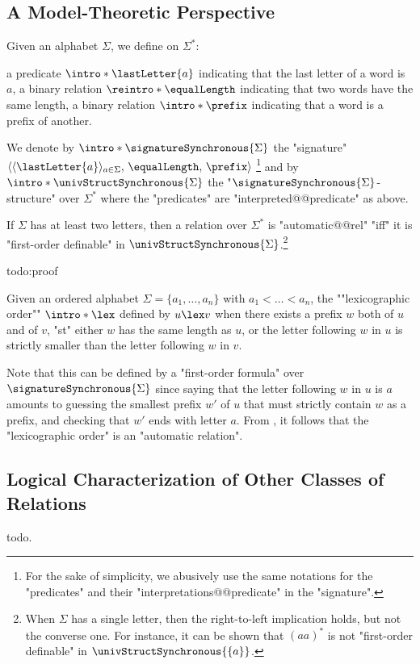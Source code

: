 \subsection{A Model-Theoretic Perspective}

Given an alphabet $\Sigma$, we define on $\Sigma^*$:
\begin{itemize}
	\itemAP a predicate $\intro*\lastLetter{a}$ indicating that the last letter of a word is $a$,
	\itemAP a binary relation $\reintro*\equalLength$ indicating that two words have the same length,
	\itemAP a binary relation $\intro*\prefix$ indicating that a word is a prefix of another.
\end{itemize} 
We denote by $\intro*\signatureSynchronous{\Sigma}$ the "signature" $\langle \langle\lastLetter{a}\rangle_{a \in \Sigma},\, \equalLength,\, \prefix \rangle$%
\footnote{For the sake of simplicity, we abusively use the same notations for
the "predicates" and their "interpretations@@predicate" in the "signature".} and
by \AP$\intro*\univStructSynchronous{\Sigma}$ the "$\signatureSynchronous{\Sigma}$-structure" over $\Sigma^*$ where
the "predicates" are "interpreted@@predicate" as above.

\begin{proposition}
	\AP\label{prop:automatic-first-order}
	If $\Sigma$ has at least two letters, then a relation over $\Sigma^*$
	is "automatic@@rel" "iff" it is "first-order definable" in
	$\univStructSynchronous{\Sigma}$.\footnote{When $\Sigma$ has a single letter,
	then the right-to-left implication holds, but not the converse one.
	For instance, it can be shown that $(aa)^*$ is not "first-order definable"
	in $\univStructSynchronous{\{a\}}$.}
\end{proposition}

todo:proof

\begin{example}
	\AP\label{ex:lexicographic-is-automatic}
	Given an ordered alphabet $\Sigma = \{a_1,\hdots,a_n\}$ with $a_1 < \hdots < a_n$,
	the \AP""lexicographic order"" $\intro*\lex$ defined by $u \lex v$ when there exists 
	a prefix $w$ both of $u$ and of $v$, "st" either $w$ has the same length as $u$,
	or the letter following $w$ in $u$ is strictly smaller than the letter following $w$ in $v$.
	
	Note that this can be defined by a "first-order formula" over $\signatureSynchronous{\Sigma}$
	since saying that the letter following $w$ in $u$ is $a$ amounts to
	guessing the smallest prefix $w'$ of $u$ that must strictly contain $w$ as a prefix,
	and checking that $w'$ ends with letter $a$.
	From , it follows that the "lexicographic order"
	is an "automatic relation".
\end{example}

\subsection{Logical Characterization of Other Classes of Relations}

todo.